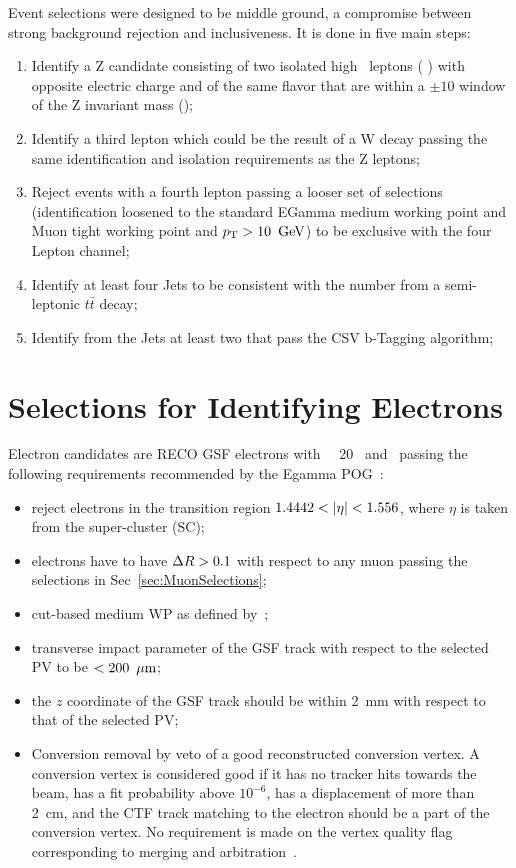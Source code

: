 Event selections were designed to be middle ground, a compromise between strong background rejection and inclusiveness. It is done in five main steps:
\begin{enumerate}
\item Identify a Z candidate consisting of two isolated high \pt \ leptons ( \GeV ) with opposite electric charge and of the same flavor that are within a $\pm 10$ \GeV window of the Z invariant mass (\zmass);
\item Identify a third lepton which could be the result of a W decay passing the same identification and isolation requirements as the Z leptons;
\item Reject events with a fourth lepton passing a looser set of selections (identification loosened to the standard EGamma medium working point and Muon tight working point and $p_{\mathrm{T}} > 10 \ \,\text{Ge\hspace{-.08em}V}$) to be exclusive with the four Lepton channel;
\item Identify at least four Jets to be consistent with the number from a semi-leptonic $t\bar{t}$ decay;
\item Identify from the Jets at least two that pass the CSV b-Tagging algorithm;
\end{enumerate}	 
	 
\section{Selections for Identifying Electrons}
\label{sec:ElectronSelections}

Electron candidates are RECO GSF electrons with \pt\ \gt\ 20 \GeV\ and \absetaele\ passing the following requirements recommended by the Egamma POG~\cite{egammaidtwiki}:
\begin{itemize}
\item reject electrons in the transition region $1.4442 < \left|\eta\right| < 1.556$, where $\eta$ is taken from the super-cluster (SC);
\item electrons have to have $\Delta R >0.1$ with respect to any muon passing the selections in Sec~\ref{sec:MuonSelections};
\item cut-based medium WP as defined by~\cite{egammaidtwiki};
\item transverse impact parameter of the GSF track with respect to the selected PV to be $<200~\,\mu\text{m}$;
\item the $z$ coordinate of the GSF track should be within 2~mm with respect to that of the selected PV;
\item Conversion removal by veto of a good reconstructed conversion vertex.  A conversion vertex is considered good if it has no tracker hits towards the beam, has a fit probability above $10^{-6}$, has a displacement of more than 2~cm, and the  CTF track matching to the electron should be a part of the conversion vertex. No requirement is made on the vertex quality flag corresponding to merging and arbitration~\cite{hwwsmurf}.
\end{itemize}

